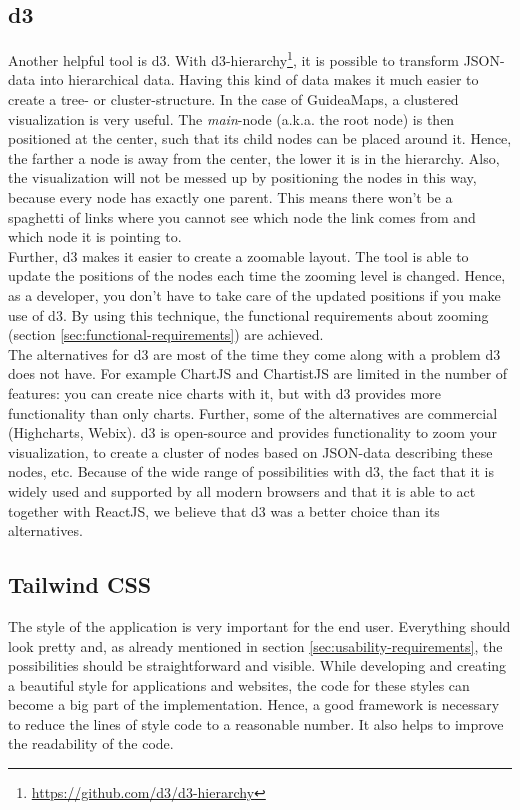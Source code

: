 \subsection{d3}\label{sec:d3}
Another helpful tool is d3. With d3-hierarchy\footnote{\url{https://github.com/d3/d3-hierarchy}}, it is possible to transform JSON-data into hierarchical data. Having this kind of data makes it much easier to create a tree- or cluster-structure. In the case of GuideaMaps, a clustered visualization is very useful. The \textit{main}-node (a.k.a. the root node) is then positioned at the center, such that its child nodes can be placed around it. Hence, the farther a node is away from the center, the lower it is in the hierarchy. Also, the visualization will not be messed up by positioning the nodes in this way, because every node has exactly one parent. This means there won't be a spaghetti of links where you cannot see which node the link comes from and which node it is pointing to.\\

Further, d3 makes it easier to create a zoomable layout. The tool is able to update the positions of the nodes each time the zooming level is changed. Hence, as a developer, you don't have to take care of the updated positions if you make use of d3. By using this technique, the functional requirements about zooming (section \ref{sec:functional-requirements}) are achieved.\\

The alternatives for d3 are most of the time they come along with a problem d3 does not have. For example ChartJS and ChartistJS are limited in the number of features: you can create nice charts with it, but with d3 provides more functionality than only charts. Further, some of the alternatives are commercial (Highcharts, Webix). d3 is open-source and provides functionality to zoom your visualization, to create a cluster of nodes based on JSON-data describing these nodes, etc. Because of the wide range of possibilities with d3, the fact that it is widely used and supported by all modern browsers and that it is able to act together with ReactJS, we believe that d3 was a better choice than its alternatives. 

\subsection{Tailwind CSS}\label{sec:tailwind}
The style of the application is very important for the end user. Everything should look pretty and, as already mentioned in section \ref{sec:usability-requirements}, the possibilities should be straightforward and visible. While developing and creating a beautiful style for applications and websites, the code for these styles can become a big part of the implementation. Hence, a good framework is necessary to reduce the lines of style code to a reasonable number. It also helps to improve the readability of the code.\\

